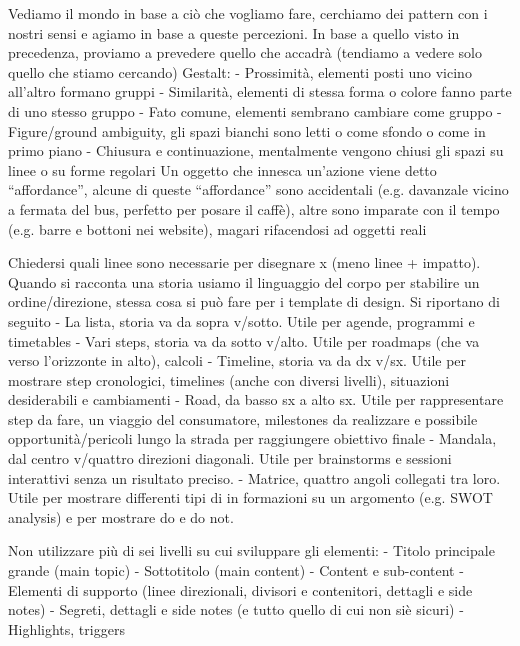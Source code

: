Vediamo il mondo in base a ciò che vogliamo fare, cerchiamo dei pattern con i nostri sensi e agiamo in base a queste percezioni. In base a quello visto in precedenza, proviamo a prevedere quello che accadrà (tendiamo a vedere solo quello che stiamo cercando)
Gestalt:
-	Prossimità, elementi posti uno vicino all'altro formano gruppi
-	Similarità, elementi di stessa forma o colore fanno parte di uno stesso gruppo
-	Fato comune, elementi sembrano cambiare come gruppo
-	Figure/ground ambiguity, gli spazi bianchi sono letti o come sfondo o come in primo piano
-	Chiusura e continuazione, mentalmente vengono chiusi gli spazi su linee o su forme regolari 
Un oggetto che innesca un'azione viene detto “affordance”, alcune di queste “affordance” sono accidentali (e.g. davanzale vicino a fermata del bus, perfetto per posare il caffè), altre sono imparate con il tempo (e.g. barre e bottoni nei website), magari rifacendosi ad oggetti reali


Chiedersi quali linee sono necessarie per disegnare x (meno linee + impatto).
Quando si racconta una storia usiamo il linguaggio del corpo per stabilire un ordine/direzione, stessa cosa si può fare per i template di design. Si riportano di seguito
-	La lista, storia va da sopra v/sotto. Utile per agende, programmi e timetables
-	Vari steps, storia va da sotto v/alto. Utile per roadmaps (che va verso l'orizzonte in alto), calcoli
-	Timeline, storia va da dx v/sx. Utile per mostrare step cronologici, timelines (anche con diversi livelli), situazioni desiderabili e cambiamenti
-	Road, da basso sx a alto sx. Utile per rappresentare step da fare, un viaggio del consumatore, milestones da realizzare e possibile opportunità/pericoli lungo la strada per raggiungere obiettivo finale
-	Mandala, dal centro v/quattro direzioni diagonali. Utile per brainstorms e sessioni interattivi senza un risultato preciso.
-	Matrice, quattro angoli collegati tra loro. Utile per mostrare differenti tipi di in formazioni su un argomento (e.g. SWOT analysis) e per mostrare do e do not.

Non utilizzare più di sei livelli su cui sviluppare gli elementi:
-	Titolo principale grande (main topic)
-	Sottotitolo (main content)
-	Content e sub-content
-	Elementi di supporto (linee direzionali, divisori e contenitori, dettagli e side notes)
-	Segreti, dettagli e side notes (e tutto quello di cui non siè sicuri)
-	Highlights, triggers

